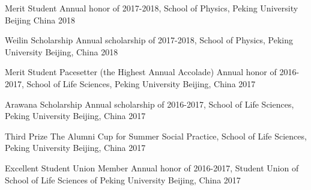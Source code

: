 




\begin{cvhonors}


\cvhonor
{Merit Student} %
{Annual honor of 2017-2018, School of Physics, Peking University} %
{Beijing China} %
{2018} %


\cvhonor
{Weilin Scholarship} %
{Annual scholarship of 2017-2018, School of Physics, Peking University} %
{Beijing, China} %
{2018} %


\cvhonor
{Merit Student Pacesetter (the Highest Annual Accolade)} %
{Annual honor of 2016-2017, School of Life Sciences, Peking University} %
{Beijing, China} %
{2017} %


\cvhonor
{Arawana Scholarship} %
{Annual scholarship of 2016-2017, School of Life Sciences, Peking University} %
{Beijing, China} %
{2017} %


\cvhonor
{Third Prize} %
{The Alumni Cup for Summer Social Practice, School of Life Sciences, Peking University} %
{Beijing, China} %
{2017} %

\cvhonor
{Excellent Student Union Member} %
{Annual honor of 2016-2017, Student Union of School of Life Sciences of Peking University} %
{Beijing, China} %
{2017} %


\end{cvhonors}

